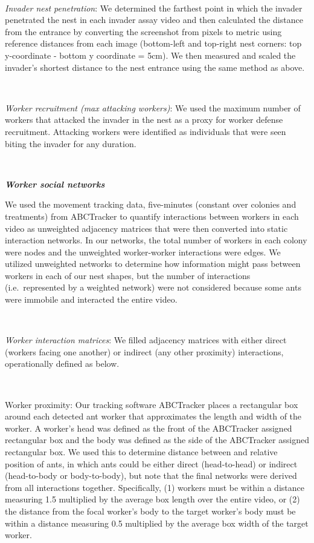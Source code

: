 \documentclass[3p]{elsarticle} %
\begin{document}
~

\emph{Invader nest penetration}: We determined the farthest point in
which the invader penetrated the nest in each invader assay video and
then calculated the distance from the entrance by converting the
screenshot from pixels to metric using reference distances from each
image (bottom-left and top-right nest corners: top y-coordinate - bottom
y coordinate = 5cm). We then measured and scaled the invader's shortest
distance to the nest entrance using the same method as above.

~

\emph{Worker recruitment (max attacking workers)}: We used the maximum
number of workers that attacked the invader in the nest as a proxy for
worker defense recruitment. Attacking workers were identified as
individuals that were seen biting the invader for any duration.

~

\textbf{\emph{Worker social networks}}

We used the movement tracking data, five-minutes (constant over colonies
and treatments) from ABCTracker to quantify interactions between workers
in each video as unweighted adjacency matrices that were then converted
into static interaction networks. In our networks, the total number of
workers in each colony were nodes and the unweighted worker-worker
interactions were edges. We utilized unweighted networks to determine
how information might pass between workers in each of our nest shapes,
but the number of interactions (i.e.~represented by a weighted network)
were not considered because some ants were immobile and interacted the
entire video.

~

\emph{Worker interaction matrices}: We filled adjacency matrices with
either direct (workers facing one another) or indirect (any other
proximity) interactions, operationally defined as below.

~

Worker proximity: Our tracking software ABCTracker places a rectangular
box around each detected ant worker that approximates the length and
width of the worker. A worker's head was defined as the front of the
ABCTracker assigned rectangular box and the body was defined as the side
of the ABCTracker assigned rectangular box. We used this to determine
distance between and relative position of ants, in which ants could be
either direct (head-to-head) or indirect (head-to-body or body-to-body),
but note that the final networks were derived from all interactions
together. Specifically, (1) workers must be within a distance measuring
1.5 multiplied by the average box length over the entire video, or (2)
the distance from the focal worker's body to the target worker's body
must be within a distance measuring 0.5 multiplied by the average box
width of the target worker.
\end{document}
